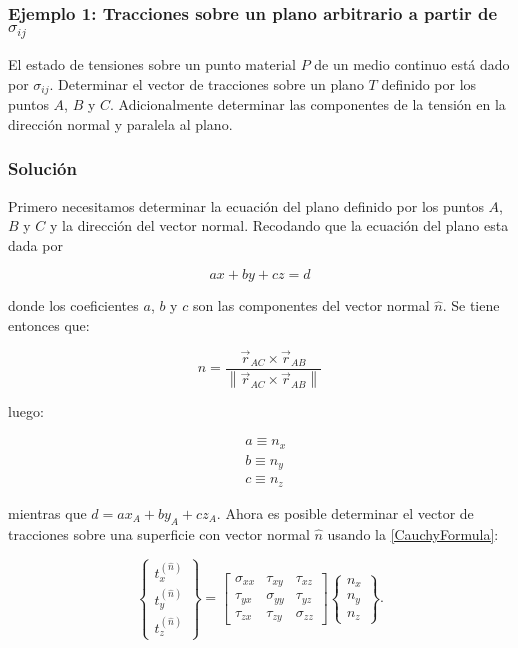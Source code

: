\documentclass[../notas medios.tex]{subfiles}
\begin{document}
\subsubsection*{Ejemplo 1: Tracciones sobre un plano arbitrario a partir de $\sigma_{ij}$}
El estado de tensiones sobre un punto material $P$ de un medio continuo está
dado por $\sigma_{ij}$. Determinar el vector de tracciones sobre un plano $T$
definido por los puntos $A$, $B$ y $C$. Adicionalmente determinar las
componentes de la tensión en la dirección normal y paralela al plano.
\subsubsection*{Solución}
Primero necesitamos determinar la ecuación del plano definido por los puntos $A$, $B$ y $C$ y la dirección del vector normal. Recodando que la ecuación del plano esta dada por

\[ax+by+cz=d\]

donde los coeficientes $a$, $b$ y $c$ son las componentes del vector normal $\hat{n}$. Se tiene entonces que:

\[\hat n = \frac{{{{\vec r}_{AC}} \times {{\vec r}_{AB}}}}{{\left\| {{{\vec r}_{AC}} \times {{\vec r}_{AB}}} \right\|}}\]

luego:

\begin{align*}
&a \equiv {n_x}\\
&b \equiv {n_y}\\
&c \equiv {n_z}
\end{align*}

mientras que $d=a x_A+b y_A+c z_A$. Ahora es posible determinar el vector de tracciones sobre una superficie con vector normal $\hat{n}$ usando la \cref{CauchyFormula}:


\[
\left\{ {\begin{array}{*{20}{c}}
{t_x^{(\hat n)}}\\
{t_y^{(\hat n)}}\\
{t_z^{(\hat n)}}
\end{array}} \right\} = \left[ {\begin{array}{*{20}{c}}
{{\sigma _{xx}}}&{{\tau _{xy}}}&{{\tau _{xz}}}\\
{{\tau _{yx}}}&{{\sigma _{yy}}}&{{\tau _{yz}}}\\
{{\tau _{zx}}}&{{\tau _{zy}}}&{{\sigma _{zz}}}
\end{array}} \right]\left\{ {\begin{array}{*{20}{c}}
{{n_x}}\\
{{n_y}}\\
{{n_z}}
\end{array}} \right\}.
\]
\end{document}
